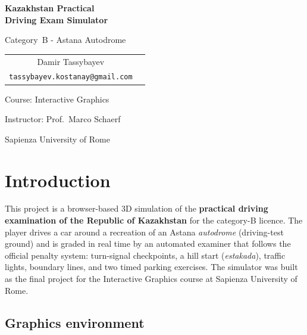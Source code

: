 \documentclass[11pt]{article}
\begin{document}
\begin{titlepage}
  \centering
  \vspace*{3cm}
  {\Huge\bfseries Kazakhstan Practical\\[2mm] Driving Exam Simulator\par}
  \vspace{4mm}
  {\large Category~B - Astana Autodrome\par}
  \vspace{2cm}

  \begin{tabular}{cc}
    \large Damir Tassybayev \\
    \texttt{tassybayev.kostanay@gmail.com} \\[4mm]
  \end{tabular}

  \vspace{2cm}
  {Course: Interactive Graphics\par}
  {Instructor: Prof.\ Marco Schaerf\par}
  {Sapienza University of Rome\par}

  \vfill
\end{titlepage}

\thispagestyle{fancy}
\tableofcontents
\newpage

\section{Introduction}

This project is a browser-based 3D simulation of the \textbf{practical driving
examination of the Republic of Kazakhstan} for the category-B licence. The player
drives a car around a recreation of an Astana \emph{autodrome} (driving-test
ground) and is graded in real time by an automated examiner that follows the
official penalty system: turn-signal checkpoints, a hill start
(\emph{estakada}), traffic lights, boundary lines, and two timed parking
exercises. The simulator was built as the final project for the Interactive
Graphics course at Sapienza University of Rome.

\subsection{Graphics environment}
\end{document}
